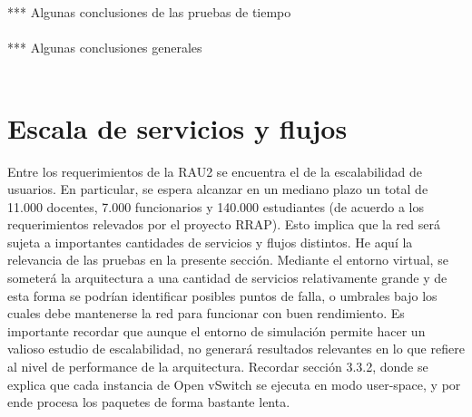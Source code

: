 *** Algunas conclusiones de las pruebas  de tiempo \\ \\
*** Algunas conclusiones generales \\ \\

\section{Escala de servicios y flujos}
Entre los requerimientos de la RAU2 se encuentra el de la escalabilidad de usuarios. En particular, se espera alcanzar en un mediano plazo un total de 11.000 docentes, 7.000 funcionarios y 140.000 estudiantes (de acuerdo a los requerimientos relevados por el proyecto RRAP). Esto implica que la red será sujeta a importantes cantidades de servicios y flujos distintos. He aquí la relevancia de las pruebas en la presente sección. Mediante el entorno virtual, se someterá la arquitectura a una cantidad de servicios relativamente grande y de esta forma se podrían identificar posibles puntos de falla, o umbrales bajo los cuales debe mantenerse la red para funcionar con buen rendimiento. Es importante recordar que aunque el entorno de simulación permite hacer un valioso estudio de escalabilidad, no generará resultados relevantes en lo que refiere al nivel de performance de la arquitectura. Recordar sección 3.3.2, donde se explica que cada instancia de Open vSwitch se ejecuta en modo user-space, y por ende procesa los paquetes de forma bastante lenta.

